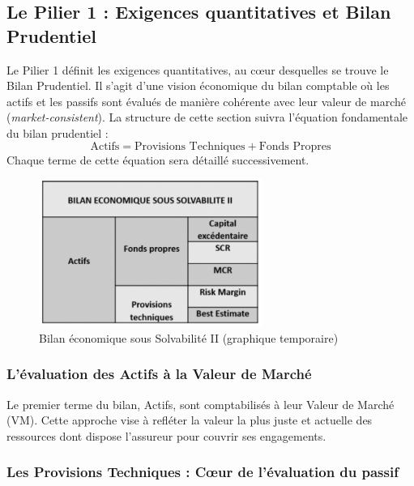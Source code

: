 \subsection{Le Pilier 1 : Exigences quantitatives et Bilan Prudentiel}

Le Pilier 1 définit les exigences quantitatives, au cœur desquelles se trouve le Bilan Prudentiel. Il s'agit d'une vision économique du bilan comptable où les actifs et les passifs sont évalués de manière cohérente avec leur valeur de marché (\textit{market-consistent}). La structure de cette section suivra l'équation fondamentale du bilan prudentiel :
\begin{equation}
    \text{Actifs} = \text{Provisions Techniques} + \text{Fonds Propres}
\end{equation}
Chaque terme de cette équation sera détaillé successivement.

\begin{figure}[H]
    \centering
    \includegraphics[width=0.65\textwidth]{images/2_chapitres/chapitre1/bilanS2.png}
    \caption{Bilan économique sous Solvabilité II (graphique temporaire)}
    \label{fig:Bilan_economique_S2}
\end{figure}


\subsubsection{L'évaluation des Actifs à la Valeur de Marché}

Le premier terme du bilan, Actifs, sont comptabilisés à leur Valeur de Marché (VM). Cette approche vise à refléter la valeur la plus juste et actuelle des ressources dont dispose l'assureur pour couvrir ses engagements.


\subsubsection{Les Provisions Techniques : Cœur de l'évaluation du passif}

